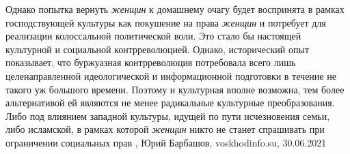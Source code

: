 Однако попытка вернуть \emph{женщин} к домашнему очагу будет воспринята в рамках
господствующей культуры как покушение на права \emph{женщин} и потребует для
реализации колоссальной политической воли. Это стало бы настоящей культурной и
социальной контрреволюцией. Однако, исторический опыт показывает, что
буржуазная контрреволюция потребовала всего лишь целенаправленной
идеологической и информационной подготовки в течение не такого уж большого
времени. Поэтому и культурная вполне возможна, тем более альтернативой ей
являются не менее радикальные культурные преобразования. Либо под влиянием
западной культуры, идущей по пути исчезновения семьи, либо исламской, в рамках
которой \emph{женщин} никто не станет спрашивать при ограничении социальных прав
, 
Юрий Барбашов, voskhodinfo.su, 30.06.2021

